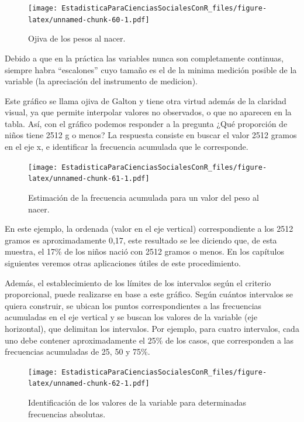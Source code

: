 \documentclass[]{book}
\begin{document}
\begin{figure}
\centering
\texttt{[image: EstadisticaParaCienciasSocialesConR\_files/figure-latex/unnamed-chunk-60-1.pdf]}
\caption{\label{fig:unnamed-chunk-60}Ojiva de los pesos al nacer.}
\end{figure}

Debido a que en la práctica las variables nunca son completamente continuas, siempre habra ``escalones'' cuyo tamaño es el de la minima medición posible de la variable (la apreciación del instrumento de medicion).

Este gráfico se llama ojiva de Galton y tiene otra virtud además de la claridad visual, ya que permite interpolar valores no observados, o que no aparecen en la tabla. Así, con el gráfico podemos responder a la pregunta ¿Qué proporción de niños tiene 2512 g o menos? La respuesta consiste en buscar el valor 2512 gramos en el eje x, e identificar la frecuencia acumulada que le corresponde.

\begin{figure}
\centering
\texttt{[image: EstadisticaParaCienciasSocialesConR\_files/figure-latex/unnamed-chunk-61-1.pdf]}
\caption{\label{fig:unnamed-chunk-61}Estimación de la frecuencia acumulada para un valor del peso al nacer.}
\end{figure}

En este ejemplo, la ordenada (valor en el eje vertical) correspondiente a los 2512 gramos es aproximadamente 0,17, este resultado se lee diciendo que, de esta muestra, el 17\% de los niños nació con 2512 gramos o menos. En los capítulos siguientes veremos otras aplicaciones útiles de este procedimiento.

Además, el establecimiento de los límites de los intervalos según el criterio proporcional, puede realizarse en base a este gráfico. Según cuántos intervalos se quiera construir, se ubican los puntos correspondientes a las frecuencias acumuladas en el eje vertical y se buscan los valores de la variable (eje horizontal), que delimitan los intervalos. Por ejemplo, para cuatro intervalos, cada uno debe contener aproximadamente el 25\% de los casos, que corresponden a las frecuencias acumuladas de 25, 50 y 75\%.

\begin{figure}
\centering
\texttt{[image: EstadisticaParaCienciasSocialesConR\_files/figure-latex/unnamed-chunk-62-1.pdf]}
\caption{\label{fig:unnamed-chunk-62}Identificación de los valores de la variable para determinadas frecuencias absolutas.}
\end{figure}
\end{document}
